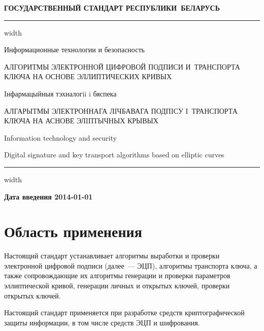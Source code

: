 \begin{center}
{\bfseries
ГОСУДАРСТВЕННЫЙ СТАНДАРТ РЕСПУБЛИКИ~БЕЛАРУСЬ
\vskip 2pt
\hrule width\textwidth

\vskip 9pt

Информационные технологии и безопасность

АЛГОРИТМЫ ЭЛЕКТРОННОЙ ЦИФРОВОЙ ПОДПИСИ И~ТРАНСПОРТА КЛЮЧА
НА ОСНОВЕ ЭЛЛИПТИЧЕСКИХ КРИВЫХ

\vskip 9pt

Iнфармацыйныя тэхналогii i бяспека

АЛГАРЫТМЫ ЭЛЕКТРОННАГА ЛIЧБАВАГА ПОДПIСУ I~ТРАНСПОРТА КЛЮЧА
НА АСНОВЕ ЭЛIПТЫЧНЫХ КРЫВЫХ
} %

\vskip 9pt

Information technology and security

Digital signature and key transport 
algorithms based on elliptic curves

\vskip 4pt                
\hrule width \textwidth
\end{center}

\mbox{}\hfill{\bfseries Дата введения 2014-01-01}

\chapter{Область применения}

Настоящий стандарт устанавливает алгоритмы выработки и проверки 
электронной цифровой подписи (далее~--- ЭЦП), алгоритмы транспорта ключа, 
а также сопровождающие их алгоритмы генерации и проверки параметров 
эллиптической кривой, генерации личных и открытых ключей, 
проверки открытых ключей.

Настоящий стандарт применяется при разработке средств криптографической
защиты информации, в том числе средств ЭЦП и шифрования.

